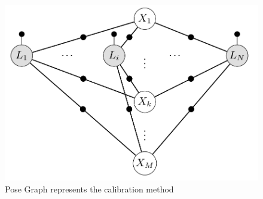 \begin{figure}[ht]
\centering
\includegraphics[width=1\textwidth]{Images/pose graph.png}
\caption{Pose Graph represents the calibration method}
\label{fig:posegraph}
\end{figure}